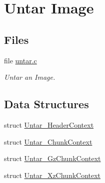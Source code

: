 \hypertarget{group__libmisc__untar__img}{}\section{Untar Image}
\label{group__libmisc__untar__img}
\subsection*{Files}
\begin{DoxyCompactItemize}
\item 
file \mbox{\hyperlink{untar_8c}{untar.\+c}}
\begin{DoxyCompactList}\small\item\em Untar an Image. \end{DoxyCompactList}\end{DoxyCompactItemize}
\subsection*{Data Structures}
\begin{DoxyCompactItemize}
\item 
struct \mbox{\hyperlink{structUntar__HeaderContext}{Untar\+\_\+\+Header\+Context}}
\item 
struct \mbox{\hyperlink{structUntar__ChunkContext}{Untar\+\_\+\+Chunk\+Context}}
\item 
struct \mbox{\hyperlink{structUntar__GzChunkContext}{Untar\+\_\+\+Gz\+Chunk\+Context}}
\item 
struct \mbox{\hyperlink{structUntar__XzChunkContext}{Untar\+\_\+\+Xz\+Chunk\+Context}}
\end{DoxyCompactItemize}
